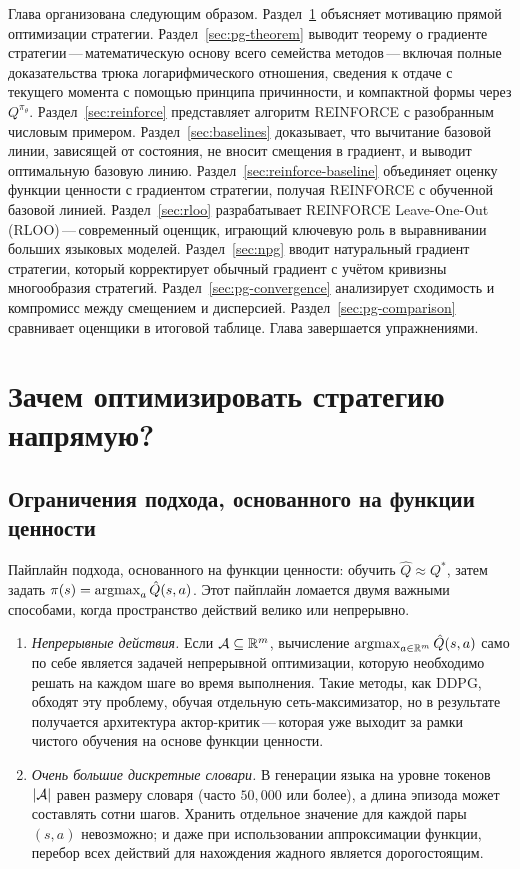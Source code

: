 Глава организована следующим образом. Раздел~\ref{sec:pg-why} объясняет мотивацию прямой оптимизации стратегии. Раздел~\ref{sec:pg-theorem} выводит теорему о градиенте стратегии\,---\,математическую основу всего семейства методов\,---\,включая полные доказательства трюка логарифмического отношения, сведения к отдаче с текущего момента с помощью принципа причинности, и компактной формы через $Q^{\pi_\theta}$. Раздел~\ref{sec:reinforce} представляет алгоритм REINFORCE с разобранным числовым примером. Раздел~\ref{sec:baselines} доказывает, что вычитание базовой линии, зависящей от состояния, не вносит смещения в градиент, и выводит оптимальную базовую линию. Раздел~\ref{sec:reinforce-baseline} объединяет оценку функции ценности с градиентом стратегии, получая REINFORCE с обученной базовой линией. Раздел~\ref{sec:rloo} разрабатывает REINFORCE Leave-One-Out (RLOO)\,---\,современный оценщик, играющий ключевую роль в выравнивании больших языковых моделей. Раздел~\ref{sec:npg} вводит натуральный градиент стратегии, который корректирует обычный градиент с учётом кривизны многообразия стратегий. Раздел~\ref{sec:pg-convergence} анализирует сходимость и компромисс между смещением и дисперсией. Раздел~\ref{sec:pg-comparison} сравнивает оценщики в итоговой таблице. Глава завершается упражнениями.

\section{Зачем оптимизировать стратегию напрямую?}
\label{sec:pg-why}

\subsection{Ограничения подхода, основанного на функции ценности}

Пайплайн подхода, основанного на функции ценности: обучить $\hat Q \approx Q^*$, затем задать $\pi(s) = \operatorname*{argmax}_a \hat Q(s,a)$. Этот пайплайн ломается двумя важными способами, когда пространство действий велико или непрерывно.

\begin{enumerate}[leftmargin=*]
\item \textit{Непрерывные действия.}  Если $\mathcal{A} \subseteq \mathbb{R}^m$, вычисление $\operatorname*{argmax}_{a \in \mathbb{R}^m} \hat Q(s,a)$ само по себе является задачей непрерывной оптимизации, которую необходимо решать на каждом шаге во время выполнения. Такие методы, как DDPG, обходят эту проблему, обучая отдельную сеть-максимизатор, но в результате получается архитектура актор-критик\,---\,которая уже выходит за рамки чистого обучения на основе функции ценности.

\item \textit{Очень большие дискретные словари.}  В генерации языка на уровне токенов $|\mathcal{A}|$ равен размеру словаря (часто $50{,}000$ или более), а длина эпизода может составлять сотни шагов. Хранить отдельное значение для каждой пары $(s,a)$ невозможно; и даже при использовании аппроксимации функции, перебор всех действий для нахождения жадного является дорогостоящим.
\end{enumerate}

